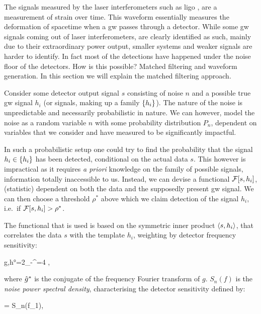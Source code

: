 \documentclass[
  10pt,
  a4paper,
  DIV=11,
  numbers=noendperiod,
  oneside]{scrreprt}
\let\[\relax \let\]\relax %
\DeclareRobustCommand{\[}{\begin{equation}}
\DeclareRobustCommand{\]}{\end{equation}}
\begin{document}
The signals measured by the laser interferometers such as \gls{ligo} ,
are a measurement of strain over time. This waveform essentially
measures the deformation of spacetime when a \gls{gw} passes through a
detector. While some \gls{gw} signals coming out of laser
interferometers, are clearly identified as such, mainly due to their
extraordinary power output, smaller systems and weaker signals are
harder to identify. In fact most of the detections have happened under
the noise floor of the detectors. How is this possible? Matched
filtering and waveform generation. In this section we will explain the
matched filtering approach.

Consider some detector output signal \(s\) consisting of noise \(n\) and
a possible true \gls{gw} signal \(h_i\) (or signals, making up a family
\(\brk{h_i}\)). The nature of the noise is unpredictable and necessarily
probabilistic in nature. We can however, model the noise as a random
variable \(n\) with some probability distribution \(P_n\), dependent on
variables that we consider and have measured to be significantly
impactful.

In such a probabilistic setup one could try to find the probability that
the signal \(h_i\in \brk{h_i}\) has been detected, conditional on the
actual data \(s\). This however is impractical as it requires \emph{a
priori} knowledge on the family of possible signals, information totally
inaccessible to us. Instead, we can devise a functional
\(\mathcal{F}\brc{s,h_i}\), (statistic) dependent on both the data and
the supposedly present \gls{gw} signal. We can then choose a threshold
\(\rho^*\) above which we claim detection of the signal \(h_i\), i.e.~if
\(\mathcal{F}\brc{s,h_i}>\rho^*\).

The functional that is used is based on the symmetric inner product
\(\ang{s,h_i}\), that correlates the data \(s\) with the template
\(h_i\), weighting by detector frequency sensitivity:

\[\ang{g,h}=2\int\limits_{-\infty}^{\infty}=4 ,\]

where \(\conj{\ft{g}{2\pi}}\) is the conjugate of the frequency Fourier
transform of \(g\). \(S_n(f)\) is the \emph{noise power spectral
density}, characterising the detector sensitivity defined by:

\[
=\half {} S_n(f_1),
\]
\end{document}
